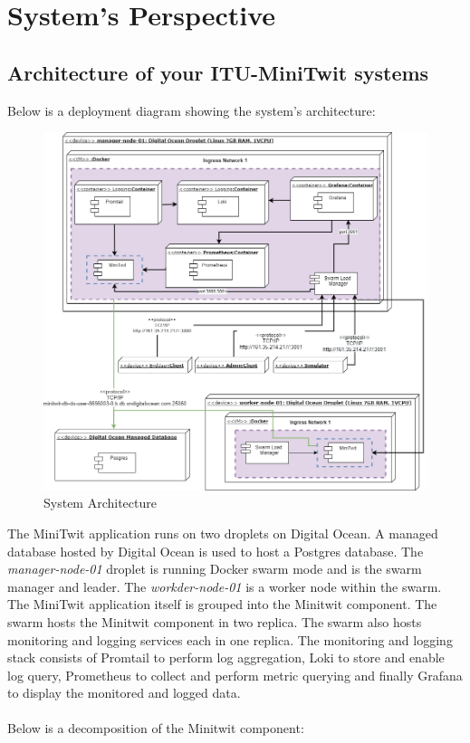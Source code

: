 \section{System's Perspective}
\subsection{Architecture of your ITU-MiniTwit systems}
Below is a deployment diagram showing the system's architecture:
\begin{figure}[h!]
    \centering
    \includegraphics[width=1.2\linewidth]{report/images/system-architecture.png}
    \caption{System Architecture}
    \label{fig:arcitechture-overview}
\end{figure}

The MiniTwit application runs on two droplets on Digital Ocean. A managed database hosted by Digital Ocean is used to host a Postgres database. The \textit{manager-node-01} droplet is running Docker swarm mode and is the swarm manager and leader\cite{docker-swarm}. The \textit{workder-node-01} is a worker node within the swarm. The MiniTwit application itself is grouped into the Minitwit component. The swarm hosts the Minitwit component in two replica. The swarm also hosts monitoring and logging services each in one replica. The monitoring and logging stack consists of Promtail to perform log aggregation, Loki to store and enable log query, Prometheus to collect and perform metric querying and finally Grafana to display the monitored and logged data. \\
\\
Below is a decomposition of the Minitwit component:

